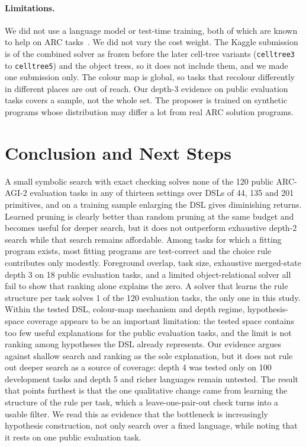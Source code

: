 \documentclass[sigconf,nonacm]{acmart}
\begin{document}
\paragraph{Limitations.} We did not use a language model or test-time training, both of which are known to help on ARC tasks~\cite{akyurek2024ttt,butt2024codeit,pourcel2025soar}. We did not vary the cost weight. The Kaggle submission is of the combined solver as frozen before the later cell-tree variants (\texttt{celltree3} to \texttt{celltree5}) and the object trees, so it does not include them, and we made one submission only. The colour map is global, so tasks that recolour differently in different places are out of reach. Our depth-3 evidence on public evaluation tasks covers a sample, not the whole set. The proposer is trained on synthetic programs whose distribution may differ a lot from real ARC solution programs.

\section{Conclusion and Next Steps}

A small symbolic search with exact checking solves none of the 120 public ARC-AGI-2 evaluation tasks in any of thirteen settings over DSLs of 44, 135 and 201 primitives, and on a training sample enlarging the DSL gives diminishing returns. Learned pruning is clearly better than random pruning at the same budget and becomes useful for deeper search, but it does not outperform exhaustive depth-2 search while that search remains affordable. Among tasks for which a fitting program exists, most fitting programs are test-correct and the choice rule contributes only modestly. Foreground overlap, task size, exhaustive merged-state depth 3 on 18 public evaluation tasks, and a limited object-relational solver all fail to show that ranking alone explains the zero. A solver that learns the rule structure per task solves 1 of the 120 evaluation tasks, the only one in this study. Within the tested DSL, colour-map mechanism and depth regime, hypothesis-space coverage appears to be an important limitation: the tested space contains too few useful explanations for the public evaluation tasks, and the limit is not ranking among hypotheses the DSL already represents. Our evidence argues against shallow search and ranking as the sole explanation, but it does not rule out deeper search as a source of coverage: depth 4 was tested only on 100 development tasks and depth 5 and richer languages remain untested. The result that points furthest is that the one qualitative change came from learning the structure of the rule per task, which a leave-one-pair-out check turns into a usable filter. We read this as evidence that the bottleneck is increasingly hypothesis construction, not only search over a fixed language, while noting that it rests on one public evaluation task.
\end{document}

